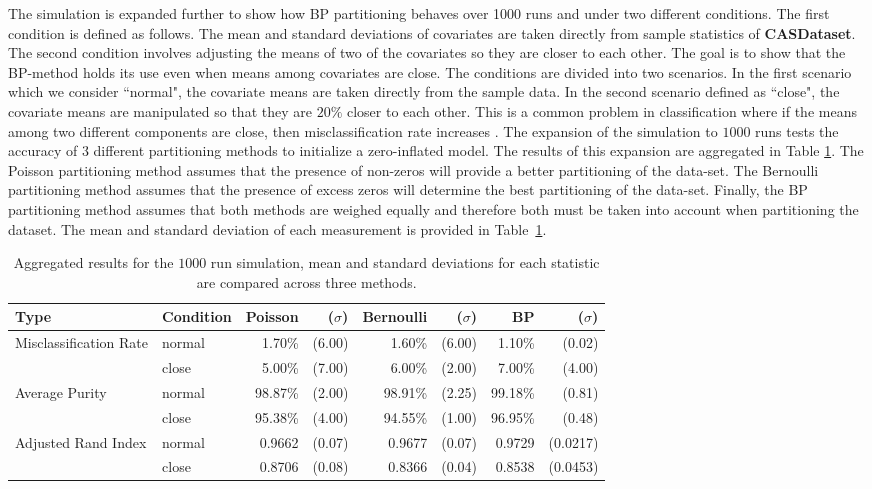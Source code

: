 \documentclass[12pt,letterpaper]{article}
\numberwithin{equation}{section}
\numberwithin{equation}{section}
\numberwithin{equation}{section}
\begin{document}
The simulation is expanded further to show how BP partitioning behaves over 1000 runs and under two different conditions. The first condition is defined as follows. The mean and standard deviations of covariates are taken directly from sample statistics of \textbf{CASDataset}. The second condition involves adjusting the means of two of the covariates so they are closer to each other. The goal is to show that the BP-method holds its use even when means among covariates are close. The conditions are divided into two scenarios. In the first scenario which we consider ``normal", the covariate means are taken directly from the sample data. In the second scenario defined as ``close", the covariate means are manipulated so that they are $20 \%$ closer to each other. This is a common problem in classification where if the means among two different components are close, then misclassification rate increases \citep{LimHwa}. The expansion of the simulation to $1000$ runs tests the accuracy of 3 different partitioning methods to initialize a zero-inflated model. The results of this expansion are aggregated in Table \ref{table:exper2}.  The Poisson partitioning method assumes that the presence of non-zeros will provide a better partitioning of the data-set. The Bernoulli partitioning method assumes that the presence of excess zeros will determine the best partitioning of the data-set. Finally, the BP partitioning method assumes that both methods are weighed equally and therefore both must be taken into account when partitioning the dataset. The mean and standard deviation of each measurement is provided in Table~\ref{table:exper2}.
\begin{table}[!htb]
\begin{center}
\caption{Aggregated results for the $1000$ run simulation, mean and standard deviations for each statistic are compared across three methods.}
\label{table:exper2}
{\small\begin{tabular}{llrrrrrr}
\hline
Type   & Condition & Poisson & ($\sigma $) & Bernoulli & ($ \sigma $) & BP & ($ \sigma $) \\
\hline
Misclassification Rate& normal        & 1.70\% & (6.00)       & 1.60\%  & (6.00)         & 1.10\% & (0.02)         \\
       & close      & 5.00\% & (7.00)       & 6.00\% & (2.00)         & 7.00\% & (4.00)         \\
Average Purity & normal     & 98.87\% & (2.00)    & 98.91\% & (2.25)      & 99.18\% & (0.81)     \\
       & close       & 95.38\% & (4.00)    & 94.55\% & (1.00)      & 96.95\% & (0.48)      \\
Adjusted Rand Index  & normal      & 0.9662 & (0.07)    & 0.9677  & (0.07)     & 0.9729 & (0.0217)      \\
       & close         & 0.8706 & (0.08)    & 0.8366 & (0.04)      & 0.8538 & (0.0453) \\
       \hline
\end{tabular}}
\end{center}
\end{table}
\end{document}
